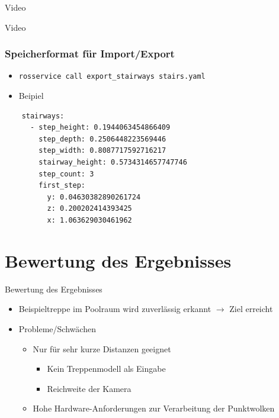 \documentclass[18pt]{beamer}
\begin{document}
\begin{frame}{Video}
\begin{center}Video\end{center}
\end{frame}

\begin{frame}[fragile]
\frametitle{Speicherformat für Import/Export}
\begin{itemize}
	\item \texttt{rosservice call export\_stairways stairs.yaml}
	\item Beipiel
\end{itemize}
\begin{center}
	\begin{lstlisting}
	stairways:
	  - step_height: 0.1944063454866409
	    step_depth: 0.2506448223569446
	    step_width: 0.8087717592716217
	    stairway_height: 0.5734314657747746
	    step_count: 3
	    first_step:
	      y: 0.04630382890261724
	      z: 0.200202414393425
	      x: 1.063629030461962

	\end{lstlisting}
\end{center}
\end{frame}



\section{Bewertung des Ergebnisses}

\begin{frame}{Bewertung des Ergebnisses}
\begin{itemize}
	\item Beispieltreppe im Poolraum wird zuverlässig erkannt \(\longrightarrow\) Ziel erreicht
	\item Probleme/Schwächen
	\begin{itemize}
		\item Nur für sehr kurze Distanzen geeignet
		\begin{itemize}
			\item Kein Treppenmodell als Eingabe
			\item Reichweite der Kamera
		\end{itemize}
		\item Hohe Hardware-Anforderungen zur Verarbeitung der Punktwolken
	\end{itemize}
\end{itemize}
\end{frame}
\end{document}
